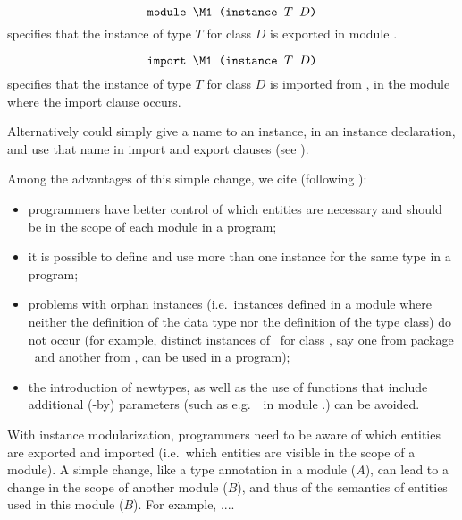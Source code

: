   \[ \text{\tt module \M1\ (instance $T$ $D$)} \]
specifies that the instance of type $T$ for class $D$ is exported in
module . 

  \[ \text{\tt import \M1\ (instance $T$ $D$)} \]
specifies that the instance of type $T$ for class $D$ is imported from
, in the module where the import clause occurs. 

Alternatively could simply give a name to an instance, in an instance
declaration, and use that name in import and export clauses (see
\cite{Controlling-scope-instances}).

Among the advantages of this simple change, we cite (following
\cite{Controlling-scope-instances}):

\begin{itemize}

  \item programmers have better control of which entities are
    necessary and should be in the scope of each module in a program;

  \item it is possible to define and use more than one instance for
    the same type in a program;

  \item problems with orphan instances (i.e.~instances defined in a
    module where neither the definition of the data type nor the
    definition of the type class) do not occur (for example, distinct
    instances of \Either\ for class \Monad, say one from package
    \mtl\ and another from \transformers, can be used in a program);

  \item the introduction of newtypes, as well as the use of functions
    that include additional (-by) parameters (such as e.g.~\sortBy\ in
    module \Data.\List) can be avoided.

\end{itemize}

With instance modularization, programmers need to be aware of which
entities are exported and imported (i.e.~which entities are visible in
the scope of a module). A simple change, like a type annotation in a
module ($A$), can lead to a change in the scope of another module
($B$), and thus of the semantics of entities used in this module
($B$). For example, ....





